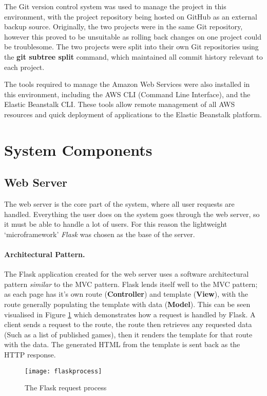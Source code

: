 The Git version control system was used to manage the project in this environment, with the project repository being hosted on GitHub as an external backup source. Originally, the two projects were in the same Git repository, however this proved to be unsuitable as rolling back changes on one project could be troublesome. The two projects were split into their own Git repositories using the \textbf{git subtree split} command, which maintained all commit history relevant to each project.

The tools required to manage the Amazon Web Services were also installed in this environment, including the AWS CLI (Command Line Interface), and the Elastic Beanstalk CLI. These tools allow remote management of all AWS resources and quick deployment of applications to the Elastic Beanstalk platform.

\section{System Components}
\label{section:systemcomponents}
	\subsection{Web Server}
	The web server is the core part of the system, where all user requests are handled. Everything the user does on the system goes through the web server, so it must be able to handle a lot of users. For this reason the lightweight `microframework' \emph{Flask} was chosen as the base of the server. %

	\paragraph{Architectural Pattern.}
	The Flask application created for the web server uses a software architectural pattern \emph{similar} to the MVC pattern. Flask lends itself well to the MVC pattern; as each page has it's own route (\textbf{Controller}) and template (\textbf{View}), with the route generally populating the template with data (\textbf{Model}). This can be seen visualised in Figure \ref{fig:flaskprocess} which demonstrates how a request is handled by Flask. A client sends a request to the route, the route then retrieves any requested data (Such as a list of published games), then it renders the template for that route with the data. The generated HTML from the template is sent back as the HTTP response.

	\begin{figure}[h]
		\centering
		\texttt{[image: flaskprocess]}
		\caption{The Flask request process}
		\label{fig:flaskprocess}
	\end{figure}

